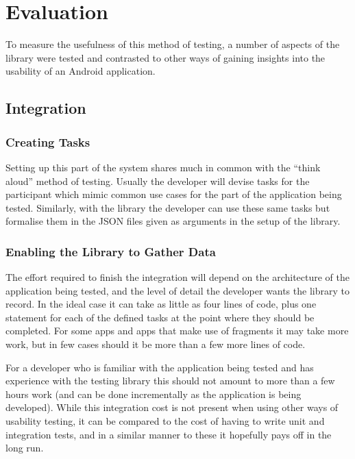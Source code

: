 \chapter{Evaluation}

To measure the usefulness of this method of testing, a number of
aspects of the library were tested and contrasted to other ways of
gaining insights into the usability of an Android application.

\section{Integration}

\subsection{Creating Tasks}

Setting up this part of the system shares much in common with the
``think aloud'' method of testing.  Usually the developer will
devise tasks for the participant which mimic common use cases for
the part of the application being tested. Similarly, with the library
the developer can use these same tasks but formalise them in the
JSON files given as arguments in the setup of the library.

\subsection{Enabling the Library to Gather Data}

The effort required to finish the integration will depend on the
architecture of the application being tested, and the level of
detail the developer wants the library to record. In the ideal case
it can take as little as four 
lines of code, plus one statement for each of the defined tasks at
the point where they should be completed. For some apps and apps
that make use of fragments it may take more work, but in few cases
should it be more than a few more lines of code.

For a developer who is familiar with the application being tested
and has experience with the testing library this should not amount
to more than a few hours work (and can be done incrementally as the
application is being developed). While this integration cost is not
present when using other ways of usability testing, it can be
compared to the cost of having to write unit and integration tests,
and in a similar manner to these it hopefully pays off in the long
run.

